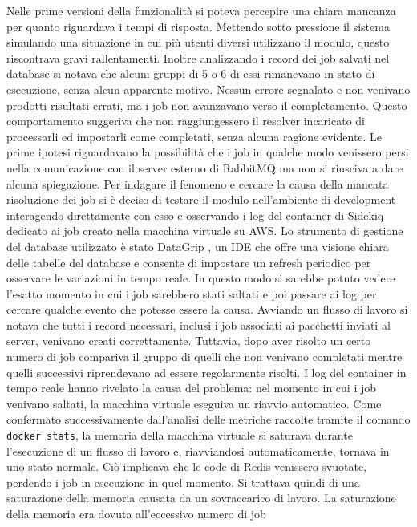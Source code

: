 \documentclass[target=bach,aauheader=,style=]{thud}
\begin{document}
Nelle prime versioni della funzionalità si poteva percepire una chiara mancanza per quanto riguardava i tempi di risposta.
Mettendo sotto pressione il sistema simulando una situazione in cui più utenti diversi utilizzano il modulo, questo riscontrava gravi rallentamenti.
Inoltre analizzando i record dei job salvati nel database si notava che alcuni gruppi di 5 o 6 di essi rimanevano in stato di esecuzione, senza alcun apparente motivo.
Nessun errore segnalato e non venivano prodotti risultati errati, ma i job non avanzavano verso il completamento. Questo comportamento suggeriva che non raggiungessero il resolver incaricato di
processarli ed impostarli come completati, senza alcuna ragione evidente. Le prime ipotesi riguardavano la possibilità che i job in qualche modo venissero persi nella comunicazione con il server
esterno di RabbitMQ ma non si riusciva a dare alcuna spiegazione. Per indagare il fenomeno e cercare la causa della mancata risoluzione dei job si è deciso di testare il modulo nell'ambiente di development
interagendo direttamente con esso e osservando i log del container di Sidekiq dedicato ai job creato nella macchina virtuale su AWS. Lo strumento di gestione del database utilizzato è stato DataGrip \cite{jetbrains_datagrip}, un IDE che offre una
visione chiara delle tabelle del database e consente di impostare un refresh periodico per osservare le variazioni in tempo reale. In questo modo si sarebbe potuto vedere l'esatto momento in cui i
job sarebbero stati saltati e poi passare ai log per cercare qualche evento che potesse essere la causa. Avviando un flusso di lavoro si notava che tutti i record necessari, inclusi i job associati
ai pacchetti inviati al server, venivano creati correttamente. Tuttavia, dopo aver risolto un certo numero di job compariva il gruppo di quelli che non venivano completati mentre quelli successivi
riprendevano ad essere regolarmente risolti. I log del container in tempo reale hanno rivelato la causa del problema: nel momento in cui i job venivano saltati, la macchina virtuale
eseguiva un riavvio automatico. Come confermato successivamente dall’analisi delle metriche raccolte tramite il comando \texttt{docker stats}, la memoria della macchina virtuale si saturava durante l'esecuzione
di un flusso di lavoro e, riavviandosi automaticamente, tornava in uno stato normale. Ciò implicava che le code di Redis venissero svuotate, perdendo i job in esecuzione in quel
momento. Si trattava quindi di una saturazione della memoria causata da un sovraccarico di lavoro. La saturazione della memoria era dovuta all'eccessivo numero di job
\end{document}
